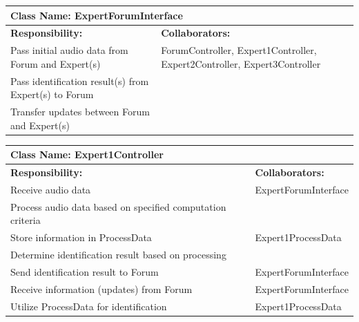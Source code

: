 \documentclass[]{article}
\begin{document}
\newpage
	\begin{table}[ht]
		\centering
		\begin{tabular}{|p{5cm}|p{5cm}|}
		\hline 
		 \multicolumn{2}{|l|}{\textbf{Class Name: ExpertForumInterface}} \\
		\hline
		\textbf{Responsibility:} & \textbf{Collaborators:} \\
		\hline
		Pass initial audio data from Forum and Expert(s) & ForumController, Expert1Controller, Expert2Controller, Expert3Controller \\
		\hline
		Pass identification result(s) from Expert(s) to Forum &  \\
		\hline
		Transfer updates between Forum and Expert(s) &  \\
		\hline
		\end{tabular}
	\end{table}
	
	\begin{table}[ht]
		\centering
		\begin{tabular}{|p{5cm}|p{5cm}|}
		\hline 
		 \multicolumn{2}{|l|}{\textbf{Class Name: Expert1Controller}} \\
		\hline
		\textbf{Responsibility:} & \textbf{Collaborators:} \\
		\hline
		Receive audio data & ExpertForumInterface \\
		\hline
		Process audio data based on specified computation criteria &  \\
		\hline
		Store information in ProcessData & Expert1ProcessData \\
		\hline
		Determine identification result based on processing &  \\
		\hline
		Send identification result to Forum & ExpertForumInterface \\
		\hline
		Receive information (updates) from Forum & ExpertForumInterface \\
		\hline
		Utilize ProcessData for identification & Expert1ProcessData \\
		\hline
		\end{tabular}
	\end{table}
	
\end{document}
